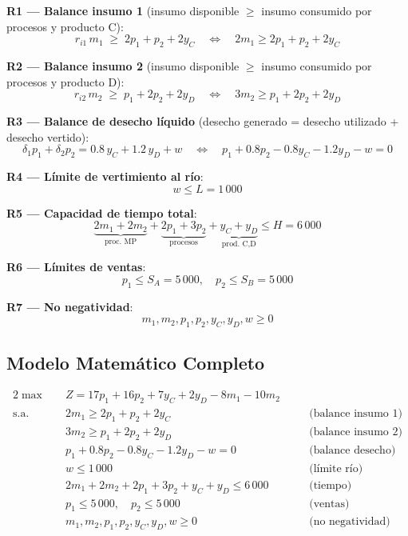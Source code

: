 \documentclass[12pt,a4paper]{article}
\begin{document}
\begin{restbox}
\textbf{R1 — Balance insumo 1}
(insumo disponible $\geq$ insumo consumido por procesos y producto C):
\[
  r_{i1}\,m_1 \;\geq\; 2p_1 + p_2 + 2y_C
  \quad\Leftrightarrow\quad
  2m_1 \geq 2p_1 + p_2 + 2y_C
\]

\textbf{R2 — Balance insumo 2}
(insumo disponible $\geq$ insumo consumido por procesos y producto D):
\[
  r_{i2}\,m_2 \;\geq\; p_1 + 2p_2 + 2y_D
  \quad\Leftrightarrow\quad
  3m_2 \geq p_1 + 2p_2 + 2y_D
\]

\textbf{R3 — Balance de desecho líquido}
(desecho generado = desecho utilizado + desecho vertido):
\[
  \delta_1 p_1 + \delta_2 p_2 = 0.8\,y_C + 1.2\,y_D + w
  \quad\Leftrightarrow\quad
  p_1 + 0.8p_2 - 0.8y_C - 1.2y_D - w = 0
\]

\textbf{R4 — Límite de vertimiento al río}:
\[
  w \leq L = 1\,000
\]

\textbf{R5 — Capacidad de tiempo total}:
\[
  \underbrace{2m_1 + 2m_2}_{\text{proc. MP}} +
  \underbrace{2p_1 + 3p_2}_{\text{procesos}} +
  \underbrace{y_C + y_D}_{\text{prod. C,D}} \leq H = 6\,000
\]

\textbf{R6 — Límites de ventas}:
\[
  p_1 \leq S_A = 5\,000, \quad p_2 \leq S_B = 5\,000
\]

\textbf{R7 — No negatividad}:
\[
  m_1, m_2, p_1, p_2, y_C, y_D, w \geq 0
\]
\end{restbox}

\subsection{Modelo Matemático Completo}

\begin{modelbox}
\begin{alignat*}{2}
  \max\quad & Z = 17p_1 + 16p_2 + 7y_C + 2y_D - 8m_1 - 10m_2\\[4pt]
  \text{s.a.}\quad
  & 2m_1 \geq 2p_1 + p_2 + 2y_C &\quad& \text{(balance insumo 1)}\\
  & 3m_2 \geq p_1 + 2p_2 + 2y_D &\quad& \text{(balance insumo 2)}\\
  & p_1 + 0.8p_2 - 0.8y_C - 1.2y_D - w = 0 &\quad& \text{(balance desecho)}\\
  & w \leq 1\,000 &\quad& \text{(límite río)}\\
  & 2m_1 + 2m_2 + 2p_1 + 3p_2 + y_C + y_D \leq 6\,000 &\quad& \text{(tiempo)}\\
  & p_1 \leq 5\,000,\quad p_2 \leq 5\,000 &\quad& \text{(ventas)}\\
  & m_1, m_2, p_1, p_2, y_C, y_D, w \geq 0 &\quad& \text{(no negatividad)}
\end{alignat*}
\end{modelbox}
\end{document}
